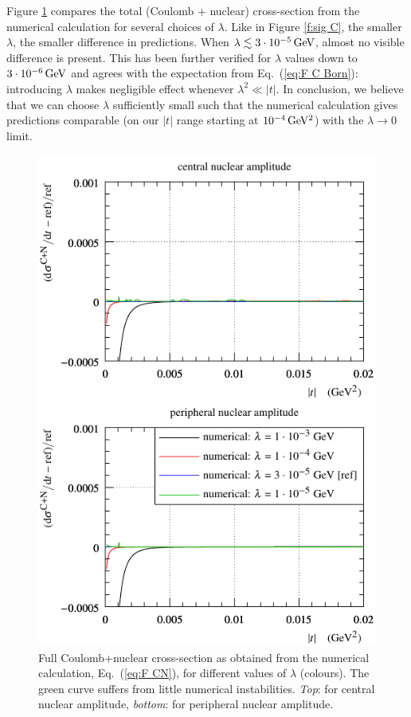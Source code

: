 \documentclass{appolb}
\def\un#1{\,{\rm #1}}
\begin{document}
Figure \ref{f:sig CN} compares the total (Coulomb + nuclear) cross-section from the numerical calculation for several choices of $\lambda$. Like in Figure \ref{f:sig C}, the smaller $\lambda$, the smaller difference in predictions. When $\lambda \lesssim 3\cdot 10^{-5}\un{GeV}$, almost no visible difference is present. This has been further verified for $\lambda$ values down to $3\cdot10^{-6}\un{GeV}$ and agrees with the expectation from Eq.~(\ref{eq:F C Born}): introducing $\lambda$ makes negligible effect whenever $\lambda^2 \ll |t|$. In conclusion, we believe that we can choose $\lambda$ sufficiently small such that the numerical calculation gives predictions comparable (on our $|t|$ range starting at $10^{-4}\un{GeV^2}$) with the $\lambda\to 0$ limit.

\begin{figure}[h]
\begin{center}
\includegraphics{fig/cni_dsdt_cmp_lambda.pdf}
\caption{Full Coulomb+nuclear cross-section as obtained from the numerical calculation, Eq.~(\ref{eq:F CN}), for different values of $\lambda$ (colours). The green curve suffers from little numerical instabilities. {\it Top}: for central nuclear amplitude, {\it bottom}: for peripheral nuclear amplitude.}
\label{f:sig CN}
\end{center}
\end{figure}
\end{document}
